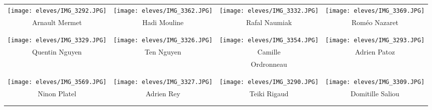 \begin{center}
\begin{tabular}{cccc}
\texttt{[image: eleves/IMG\_3292.JPG]} &
\texttt{[image: eleves/IMG\_3362.JPG]} &
\texttt{[image: eleves/IMG\_3332.JPG]} &
\texttt{[image: eleves/IMG\_3369.JPG]} \\
Arnault Mermet & Hadi Mouline & Rafal Naumiak & Roméo Nazaret \\ \\ \\ 

\texttt{[image: eleves/IMG\_3329.JPG]} &
\texttt{[image: eleves/IMG\_3326.JPG]} &
\texttt{[image: eleves/IMG\_3354.JPG]} &
\texttt{[image: eleves/IMG\_3293.JPG]} \\
Quentin Nguyen & Ten Nguyen & Camille & Adrien Patoz \\ & & Ordronneau &  \\ \\ \\ 

\texttt{[image: eleves/IMG\_3569.JPG]} &
\texttt{[image: eleves/IMG\_3327.JPG]} &
\texttt{[image: eleves/IMG\_3290.JPG]} &
\texttt{[image: eleves/IMG\_3309.JPG]} \\
Ninon Platel & Adrien Rey & Teiki Rigaud & Domitille Saliou \\ \\ \\

\end{tabular}
\end{center}

\vfill
\pagebreak

